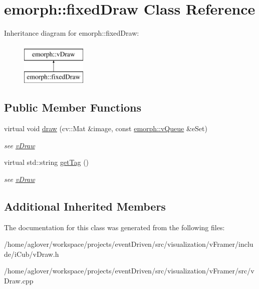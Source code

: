 \hypertarget{classemorph_1_1fixedDraw}{\section{emorph\-:\-:fixed\-Draw Class Reference}
\label{classemorph_1_1fixedDraw}
}
Inheritance diagram for emorph\-:\-:fixed\-Draw\-:\begin{figure}[H]
\begin{center}
\leavevmode
\includegraphics[height=2.000000cm]{classemorph_1_1fixedDraw}
\end{center}
\end{figure}
\subsection*{Public Member Functions}
\begin{DoxyCompactItemize}
\item 
\hypertarget{classemorph_1_1fixedDraw_a6023c32885fc396258fd111a0ed277c6}{virtual void \hyperlink{classemorph_1_1fixedDraw_a6023c32885fc396258fd111a0ed277c6}{draw} (cv\-::\-Mat \&image, const \hyperlink{classemorph_1_1vQueue}{emorph\-::v\-Queue} \&e\-Set)}\label{classemorph_1_1fixedDraw_a6023c32885fc396258fd111a0ed277c6}

\begin{DoxyCompactList}\small\item\em see \hyperlink{classemorph_1_1vDraw}{v\-Draw} \end{DoxyCompactList}\item 
\hypertarget{classemorph_1_1fixedDraw_a3b703843af2824a63c27aacb713d7f50}{virtual std\-::string \hyperlink{classemorph_1_1fixedDraw_a3b703843af2824a63c27aacb713d7f50}{get\-Tag} ()}\label{classemorph_1_1fixedDraw_a3b703843af2824a63c27aacb713d7f50}

\begin{DoxyCompactList}\small\item\em see \hyperlink{classemorph_1_1vDraw}{v\-Draw} \end{DoxyCompactList}\end{DoxyCompactItemize}
\subsection*{Additional Inherited Members}


The documentation for this class was generated from the following files\-:\begin{DoxyCompactItemize}
\item 
/home/aglover/workspace/projects/event\-Driven/src/visualization/v\-Framer/include/i\-Cub/v\-Draw.\-h\item 
/home/aglover/workspace/projects/event\-Driven/src/visualization/v\-Framer/src/v\-Draw.\-cpp\end{DoxyCompactItemize}
